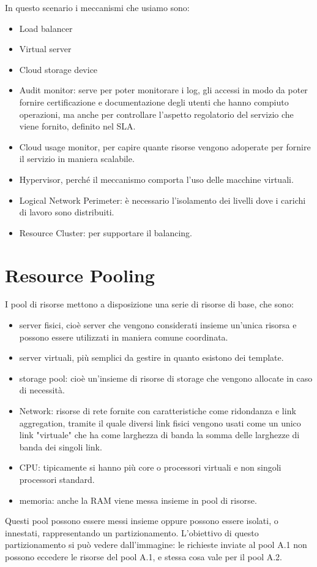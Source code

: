 In questo scenario i meccanismi che usiamo sono:
\begin{itemize}
    \item Load balancer
    \item Virtual server
    \item Cloud storage device
    \item Audit monitor: serve per poter monitorare i log, gli accessi in modo da poter fornire certificazione e documentazione degli utenti che hanno compiuto operazioni, ma anche per controllare l'aspetto regolatorio del servizio che viene fornito, definito nel SLA.
    \item Cloud usage monitor, per capire quante risorse vengono adoperate per fornire il servizio in maniera scalabile.
    \item Hypervisor, perché il meccanismo comporta l'uso delle macchine virtuali.
    \item Logical Network Perimeter: è necessario l'isolamento dei livelli dove i carichi di lavoro sono distribuiti.
    \item Resource Cluster: per supportare il balancing.
\end{itemize}

\section{Resource Pooling}
I pool di risorse mettono a disposizione una serie di risorse di base, che sono:
\begin{itemize}
    \item server fisici, cioè server che vengono considerati insieme un'unica risorsa e possono essere utilizzati in maniera comune coordinata.
    \item server virtuali, più semplici da gestire in quanto esistono dei template.
    \item storage pool: cioè un'insieme di risorse di storage che vengono allocate in caso di necessità.
    \item Network: risorse di rete fornite con caratteristiche come ridondanza e link aggregation, tramite il quale diversi link fisici vengono usati come un unico link "virtuale" che ha come larghezza di banda la somma delle larghezze di banda dei singoli link.
    \item CPU: tipicamente si hanno più core o processori virtuali e non singoli processori standard.
    \item memoria: anche la RAM viene messa insieme in pool di risorse.
\end{itemize}
Questi pool possono essere messi insieme oppure possono essere isolati, o innestati, rappresentando un partizionamento. L'obiettivo di questo partizionamento si può vedere dall'immagine: le richieste inviate al pool A.1 non possono eccedere le risorse del pool A.1, e stessa cosa vale per il pool A.2.

